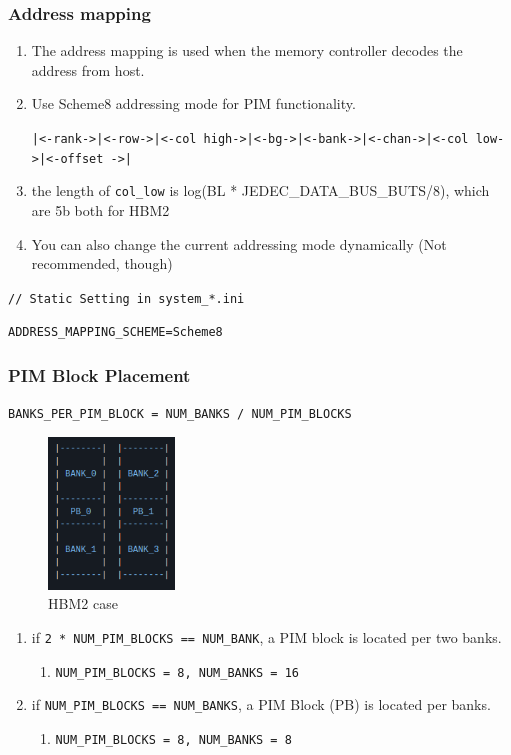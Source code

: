 \documentclass[12pt]{article}
\begin{document}
\subsubsection{Address mapping}
\begin{enumerate}
	\item The address mapping is used when the memory controller decodes the address from host.
	\item Use Scheme8 addressing mode for PIM functionality.
	
	\texttt{|<-rank->|<-row->|<-col high->|<-bg->|<-bank->|<-chan->|<-col low->|<-offset ->|}
	
	\item the length of \texttt{col\_low} is log(BL * JEDEC\_DATA\_BUS\_BUTS/8), which are 5b both for HBM2
	
	\item You can also change the current addressing mode dynamically (Not recommended, though)
\end{enumerate}

\texttt{// Static Setting in system\_*.ini}

\texttt{ADDRESS\_MAPPING\_SCHEME=Scheme8}



\subsubsection{PIM Block Placement}
\texttt{BANKS\_PER\_PIM\_BLOCK = NUM\_BANKS / NUM\_PIM\_BLOCKS}


\begin{figure}[h]
	\centering
	\includegraphics[width=0.3\textwidth]{Images/img3.png}
	\caption{HBM2 case}
	\label{fig:HBM2 case}
\end{figure}


\begin{enumerate}
	\item if \texttt{2 * NUM\_PIM\_BLOCKS == NUM\_BANK}, a PIM block is located per two banks.
	\begin{enumerate}
		\item \texttt{NUM\_PIM\_BLOCKS = 8, NUM\_BANKS = 16}
	\end{enumerate}
	\item if \texttt{NUM\_PIM\_BLOCKS == NUM\_BANKS}, a PIM Block (PB) is located per banks.
	\begin{enumerate}
		\item 
		\texttt{NUM\_PIM\_BLOCKS = 8, NUM\_BANKS = 8}
	\end{enumerate}
\end{enumerate}
\end{document}
